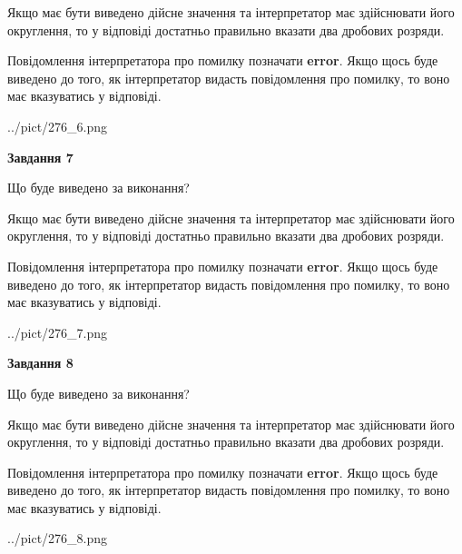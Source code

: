 \documentclass[12pt, ukrainian]{article}
\begin{document}
{\begin {Large}
Якщо має бути виведено дійсне значення та інтерпретатор має здійснювати його округлення, 
то у відповіді достатньо правильно вказати два дробових розряди.

Повідомлення інтерпретатора про помилку позначати \textbf{error}.
Якщо щось буде виведено до того, як інтерпретатор видасть повідомлення про помилку, 
то воно має вказуватись у відповіді. \par

\begin{center}
	{../pict/276_6.png}
\end{center}
\newpage

{\begin {center}\textbf{Завдання 7}\end {center}}\par
Що буде виведено за виконання? \par

Якщо має бути виведено дійсне значення та інтерпретатор має здійснювати його округлення, 
то у відповіді достатньо правильно вказати два дробових розряди.

Повідомлення інтерпретатора про помилку позначати \textbf{error}.
Якщо щось буде виведено до того, як інтерпретатор видасть повідомлення про помилку, 
то воно має вказуватись у відповіді. \par

\begin{center}
	{../pict/276_7.png}
\end{center}
\newpage

{\begin {center}\textbf{Завдання 8}\end {center}}\par
Що буде виведено за виконання? \par

Якщо має бути виведено дійсне значення та інтерпретатор має здійснювати його округлення, 
то у відповіді достатньо правильно вказати два дробових розряди.

Повідомлення інтерпретатора про помилку позначати \textbf{error}.
Якщо щось буде виведено до того, як інтерпретатор видасть повідомлення про помилку, 
то воно має вказуватись у відповіді. \par

\begin{center}
	{../pict/276_8.png}
\end{center}
\newpage


\end{Large}}
\end{document}
